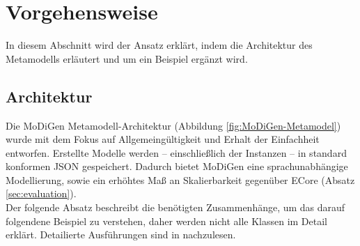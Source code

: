 \section{Vorgehensweise}
In diesem Abschnitt wird der Ansatz erkl\"art, indem die Architektur des Metamodells erl\"autert und um ein Beispiel erg\"anzt wird.



\subsection{Architektur}
Die MoDiGen Metamodell-Architektur (Abbildung \ref{fig:MoDiGen-Metamodel}) wurde mit dem Fokus auf Allgemeingültigkeit und Erhalt der Einfachheit entworfen. Erstellte Modelle werden -- einschließlich der Instanzen -- in standard konformen JSON gespeichert. Dadurch bietet MoDiGen eine sprachunabhängige Modellierung, sowie ein erhöhtes Maß an Skalierbarkeit gegenüber ECore (Absatz \ref{sec:evaluation}).\\Der folgende Absatz beschreibt die benötigten Zusammenhänge, um das darauf folgendene Beispiel zu verstehen, daher werden nicht alle Klassen im Detail erkl\"art. Detailierte Ausführungen sind in \cite{gerhart2015approach} nachzulesen.\\\\



